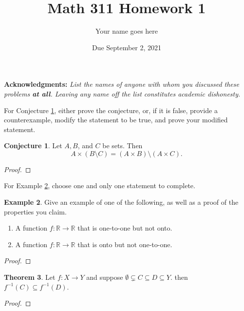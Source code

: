 \documentclass[11pt]{article}		%
\title{Math 311 Homework 1}
\author{Your name goes here}
\date{Due September 2, 2021}
\def\R{{\mathbb R}}
\theoremstyle{definition}
\newtheorem{theorem}{Theorem}\
\newtheorem{conj}[theorem]{Conjecture}
\newtheorem{example}[theorem]{Example}
\begin{document}
\maketitle

\noindent\textbf{Acknowledgments:} \emph{List the names of anyone with whom you discussed these problems \textbf{at all}. Leaving any name off the list constitutes academic dishonesty.}

For Conjecture \ref{conj-setminus}, either prove the conjecture, or, if it is false, provide a counterexample, modify the statement to be true, and prove your modified statement.

\begin{conj}\label{conj-setminus}
	Let $A, B$, and $C$ be sets.
	Then
	\[
		A\times (B\setminus C) = (A\times B)\setminus (A\times C).
	\]
\end{conj}

\begin{proof}

\end{proof}



For Example \ref{example-functions}, choose one and only one statement to complete.

\begin{example}\label{example-functions}
	Give an example of one of the following, as well as a proof of the properties you claim.
	\begin{enumerate}
		\item A function $f : \R\to \R$ that is one-to-one but not onto.
		\item A function $f: \R\to \R$ that is onto but not one-to-one.
	\end{enumerate}
\end{example}

\begin{proof}

\end{proof}



\begin{theorem}
	Let $f: X\to Y$ and suppose $\emptyset\subsetneq C\subseteq D\subseteq Y$.
	then $f^{-1}(C) \subseteq f^{-1} (D)$.
\end{theorem}

\begin{proof}
 
\end{proof}
\end{document}
